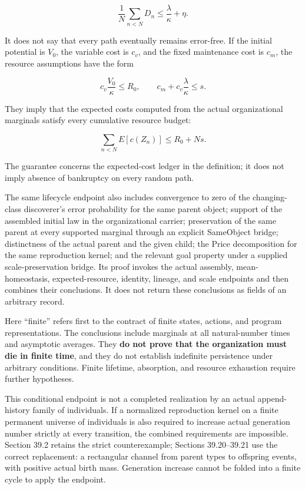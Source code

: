 \documentclass[
  english,
  11pt,
  oneside]{book}
\begin{document}
\[\frac1N\sum_{n<N}D_n\le\frac\lambda\kappa+\eta.\]

It does not say that every path eventually remains error-free. If the initial potential is \(V_0\), the variable cost is \(c_v\), and the fixed maintenance cost is \(c_m\), the resource assumptions have the form

\[c_v\frac{V_0}{\kappa}\le R_0,\qquad
c_m+c_v\frac\lambda\kappa\le s.\]

They imply that the expected costs computed from the actual organizational marginals satisfy every cumulative resource budget:

\[\sum_{n<N}E[c(Z_n)]\le R_0+Ns.\]

The guarantee concerns the expected-cost ledger in the definition; it does not imply absence of bankruptcy on every random path.

The same lifecycle endpoint also includes convergence to zero of the changing-class discoverer's error probability for the same parent object; support of the assembled initial law in the organizational carrier; preservation of the same parent at every supported marginal through an explicit SameObject bridge; distinctness of the actual parent and the given child; the Price decomposition for the same reproduction kernel; and the relevant goal property under a supplied scale-preservation bridge. Its proof invokes the actual assembly, mean-homeostasis, expected-resource, identity, lineage, and scale endpoints and then combines their conclusions. It does not return these conclusions as fields of an arbitrary record.

Here ``finite'' refers first to the contract of finite states, actions, and program representations. The conclusions include marginals at all natural-number times and asymptotic averages. They \textbf{do not prove that the organization must die in finite time}, and they do not establish indefinite persistence under arbitrary conditions. Finite lifetime, absorption, and resource exhaustion require further hypotheses.

This conditional endpoint is not a completed realization by an actual append-history family of individuals. If a normalized reproduction kernel on a finite permanent universe of individuals is also required to increase actual generation number strictly at every transition, the combined requirements are impossible. Section 39.2 retains the strict counterexample; Sections 39.20--39.21 use the correct replacement: a rectangular channel from parent types to offspring events, with positive actual birth mass. Generation increase cannot be folded into a finite cycle to apply the endpoint.
\end{document}
